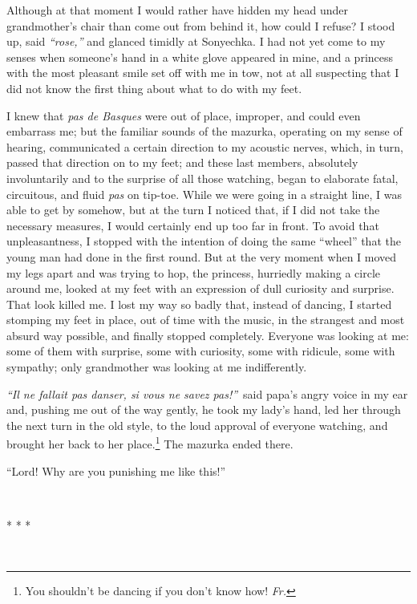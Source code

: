 Although at that moment I would rather have hidden my head under grandmother's chair than come out from behind it, how could I refuse? I stood up, said \textit{``rose,''} and glanced timidly at Sonyechka. I had not yet come to my senses when someone's hand in a white glove appeared in mine, and a princess with the most pleasant smile set off with me in tow, not at all suspecting that I did not know the first thing about what to do with my feet.

I knew that \textit{pas de Basques} were out of place, improper, and could even embarrass me; but the familiar sounds of the mazurka, operating on my sense of hearing, communicated a certain direction to my acoustic nerves, which, in turn, passed that direction on to my feet; and these last members, absolutely involuntarily and to the surprise of all those watching, began to elaborate fatal, circuitous, and fluid \textit{pas} on tip-toe. While we were going in a straight line, I was able to get by somehow, but at the turn I noticed that, if I did not take the necessary measures, I would certainly end up too far in front. To avoid that unpleasantness, I stopped with the intention of doing the same ``wheel'' that the young man had done in the first round. But at the very moment when I moved my legs apart and was trying to hop, the princess, hurriedly making a circle around me, looked at my feet with an expression of dull curiosity and surprise. That look killed me. I lost my way so badly that, instead of dancing, I started stomping my feet in place, out of time with the music, in the strangest and most absurd way possible, and finally stopped completely. Everyone was looking at me: some of them with surprise, some with curiosity, some with ridicule, some with sympathy; only grandmother was looking at me indifferently.

\textit{``Il ne fallait pas danser, si vous ne savez pas!''}~said papa's angry voice in my ear and, pushing me out of the way gently, he took my lady's hand, led her through the next turn in the old style, to the loud approval of everyone watching, and brought her back to her place.\footnote{You shouldn't be dancing if you don't know how! \textit{Fr.}} The mazurka ended there. %

``Lord! Why are you punishing me like this!'' %

~

\centerline{* * *}

~


